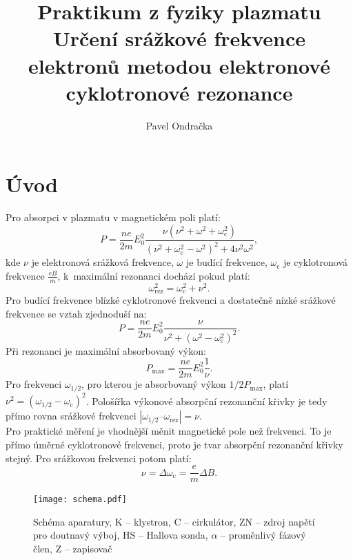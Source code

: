 \documentclass[12pt]{article}
\begin{document}
\title{Praktikum z fyziky plazmatu\\
Určení srážkové frekvence elektronů metodou elektronové cyklotronové rezonance}
\author{Pavel Ondračka}
\maketitle

\section{Úvod}

Pro absorpci v plazmatu v magnetickém poli platí:
\begin{equation}
P = \frac{ne} {2m}  E_0^2 \frac{\nu(\nu^2 + \omega^2 + \omega_\mathrm{c}^2)}{(\nu^2 + \omega_\mathrm{c}^2 - \omega^2)^2 + 4 \nu^2 \omega^2} \mathrm{,}
\end{equation}
kde $\nu$ je elektronová srážková frekvence, $\omega$ je budící frekvence, $\omega_\mathrm{c}$ je cyklotronová frekvence $\frac{eB}{m}$, k~maximální rezonanci dochází pokud platí:
\begin{equation}
\omega^2_\mathrm{rez} =  \omega_\mathrm{c}^2 + \nu^2 \mathrm{.}
\end{equation}	
Pro budící frekvence blízké cyklotronové frekvenci a dostatečně nízké srážkové frekvence se vztah zjednoduší na:
\begin{equation}
P = \frac{ne}{2m} E_0^2 \frac{\nu}{\nu^2 + (\omega^2 - \omega_\mathrm{c}^2)^2 } \mathrm{.}
\end{equation}
Při rezonanci je maximální absorbovaný výkon:
\begin{equation}
P_\mathrm{max} = \frac{ne}{2m} E_0^2 \frac{1}{\nu} \mathrm{.}
\end{equation}
Pro frekvenci $\omega_{1/2}$, pro kterou je absorbovaný výkon $1/2P_\mathrm{max}$, platí $\nu^2 = (\omega_{1/2}  - \omega_\mathrm{c})^2$.
Pološířka výkonové absorpční rezonanční křivky je tedy přímo rovna srážkové frekvenci  $|\omega_{1/2} – \omega_\mathrm{rez}| = \nu$.\\
Pro praktické měření je vhodnější měnit magnetické pole než frekvenci. To je přímo úměrné cyklotronové frekvenci, proto je tvar absorpční rezonanční křivky stejný.
Pro srážkovou frekvenci potom platí: \begin{equation}\nu = \Delta \omega_\mathrm{c} = \frac{e} {m} \Delta B \mathrm{.}\end{equation}
 	
\begin{figure}[!htbp]
\begin{center}
\texttt{[image: schema.pdf]}
\caption{Schéma aparatury, K -- klystron, C -- cirkulátor, ZN -- zdroj napětí pro doutnavý výboj, HS -- Hallova sonda, $\alpha$ -- proměnlivý fázový člen, Z -- zapisovač}
\label{schema}
\end{center}
\end{figure}
\end{document}
